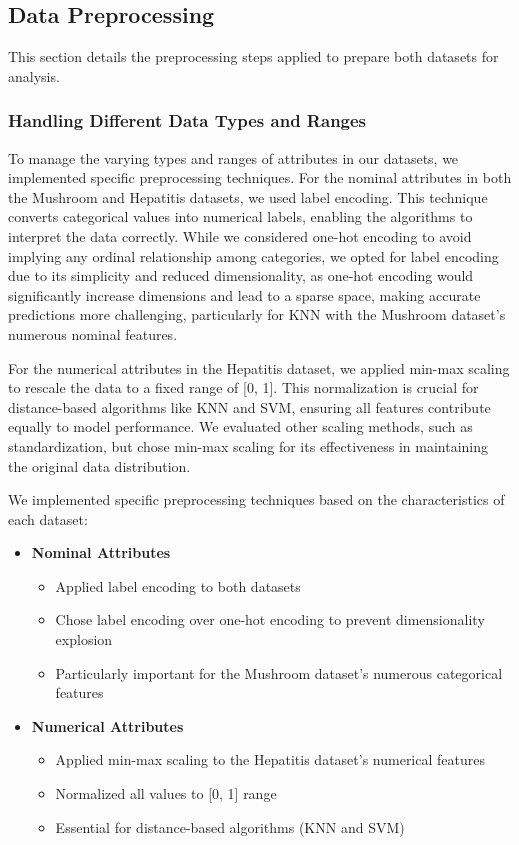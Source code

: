 \subsection{Data Preprocessing}
\label{subsec:preprocessing}

This section details the preprocessing steps applied to prepare both datasets for analysis.

\subsubsection{Handling Different Data Types and Ranges}To manage the varying types and ranges of attributes in our datasets, we implemented specific preprocessing techniques.
For the nominal attributes in both the Mushroom and Hepatitis datasets, we used label encoding.
This technique converts categorical values into numerical labels, enabling the algorithms to interpret the data correctly.
While we considered one-hot encoding to avoid implying any ordinal relationship among categories, we opted for label encoding due to its simplicity and reduced dimensionality, as one-hot encoding would significantly increase dimensions and lead to a sparse space, making accurate predictions more challenging, particularly for KNN with the Mushroom dataset's numerous nominal features.

For the numerical attributes in the Hepatitis dataset, we applied min-max scaling to rescale the data to a fixed range of [0, 1]. This normalization is crucial for distance-based algorithms like KNN and SVM, ensuring all features contribute equally to model performance.
We evaluated other scaling methods, such as standardization, but chose min-max scaling for its effectiveness in maintaining the original data distribution.

We implemented specific preprocessing techniques based on the characteristics of each dataset:

\begin{itemize}
    \item \textbf{Nominal Attributes}
    \begin{itemize}
        \item Applied label encoding to both datasets
        \item Chose label encoding over one-hot encoding to prevent dimensionality explosion
        \item Particularly important for the Mushroom dataset's numerous categorical features
    \end{itemize}
    
    \item \textbf{Numerical Attributes}
    \begin{itemize}
        \item Applied min-max scaling to the Hepatitis dataset's numerical features
        \item Normalized all values to [0, 1] range
        \item Essential for distance-based algorithms (KNN and SVM)
    \end{itemize}
\end{itemize}

